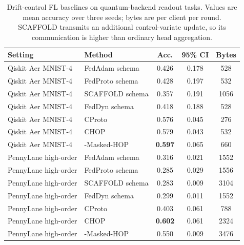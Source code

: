 \begin{table}[t]
\centering
\caption{Drift-control FL baselines on quantum-backend readout tasks. Values are mean accuracy over three seeds; bytes are per client per round. SCAFFOLD transmits an additional control-variate update, so its communication is higher than ordinary head aggregation.}
\label{tab:drift-baselines}
\begin{tabular}{llccc}
\toprule
Setting & Method & Acc. & 95\% CI & Bytes \\
\midrule
Qiskit Aer MNIST-4 & FedAdam schema & 0.426 & 0.178 & 528 \\
Qiskit Aer MNIST-4 & FedProto schema & 0.428 & 0.197 & 532 \\
Qiskit Aer MNIST-4 & SCAFFOLD schema & 0.357 & 0.191 & 1056 \\
Qiskit Aer MNIST-4 & FedDyn schema & 0.418 & 0.188 & 528 \\
Qiskit Aer MNIST-4 & CProto & 0.576 & 0.045 & 276 \\
Qiskit Aer MNIST-4 & CHOP & 0.579 & 0.043 & 532 \\
Qiskit Aer MNIST-4 & \method{}-Masked-HOP & \textbf{0.597} & 0.065 & 660 \\
\midrule
PennyLane high-order & FedAdam schema & 0.316 & 0.021 & 1552 \\
PennyLane high-order & FedProto schema & 0.285 & 0.029 & 1556 \\
PennyLane high-order & SCAFFOLD schema & 0.283 & 0.009 & 3104 \\
PennyLane high-order & FedDyn schema & 0.299 & 0.011 & 1552 \\
PennyLane high-order & CProto & 0.403 & 0.061 & 788 \\
PennyLane high-order & CHOP & \textbf{0.602} & 0.061 & 2324 \\
PennyLane high-order & \method{}-Masked-HOP & 0.550 & 0.009 & 3476 \\
\bottomrule
\end{tabular}
\end{table}
